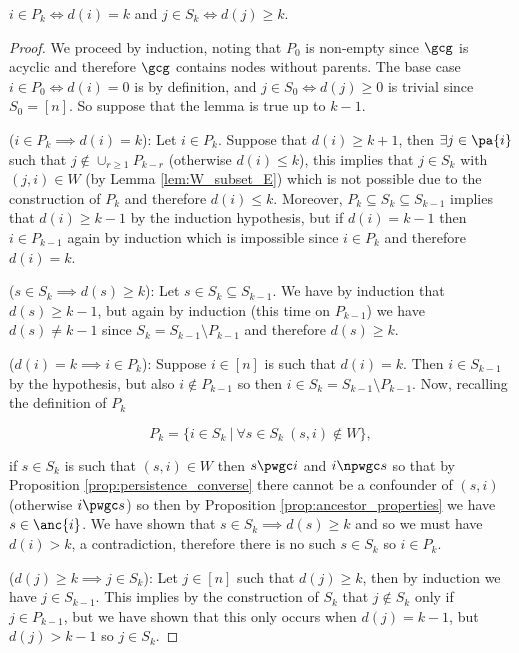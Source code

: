 \begin{lemma}
  \label{lem:depth_lemma}
  $i \in P_k \iff d(i) = k$ and $j \in S_k \iff d(j) \ge k$.
\end{lemma}
\begin{proof}
  We proceed by induction, noting that $P_0$ is non-empty since $\gcg$
  is acyclic and therefore $\gcg$ contains nodes without parents.  The
  base case $i \in P_0 \iff d(i) = 0$ is by definition, and
  $j \in S_0 \iff d(j) \ge 0$ is trivial since $S_0 = [n]$.  So
  suppose that the lemma is true up to $k - 1$.

  ($i \in P_k \implies d(i) = k$): Let $i \in P_k$.  Suppose that
  $d(i) \ge k + 1$, then $\exists j \in \pa{i}$ such that
  $j \not\in \cup_{r \ge 1}P_{k - r}$ (otherwise $d(i) \le k$), this
  implies that $j \in S_k$ with $(j, i) \in W$ (by Lemma
  \ref{lem:W_subset_E}) which is not possible due to the construction of
  $P_k$ and therefore $d(i) \le k$.  Moreover,
  $P_k \subseteq S_k \subseteq S_{k - 1}$ implies that
  $d(i) \ge k - 1$ by the induction hypothesis, but if $d(i) = k - 1$
  then $i \in P_{k - 1}$ again by induction which is impossible since
  $i \in P_k$ and therefore $d(i) = k$.

  ($s \in S_k \implies d(s) \ge k$): Let
  $s \in S_k \subseteq S_{k - 1}$.  We have by induction that
  $d(s) \ge k - 1$, but again by induction (this time on $P_{k - 1}$)
  we have $d(s) \ne k - 1$ since $S_k = S_{k - 1} \setminus P_{k - 1}$
  and therefore $d(s) \ge k$.

  ($d(i) = k \implies i \in P_k$): Suppose $i \in [n]$ is such that
  $d(i) = k$.  Then $i \in S_{k - 1}$ by the hypothesis, but also
  $i \not\in P_{k - 1}$ so then
  $i \in S_k = S_{k - 1} \setminus P_{k - 1}$.  Now, recalling the
  definition of $P_k$

  \begin{equation*}
    P_k = \{i \in S_k\ |\ \forall s \in S_k\ (s, i) \not\in W \},
  \end{equation*}

  if $s \in S_k$ is such that $(s, i) \in W$ then $s \pwgc i$ and
  $i \npwgc s$ so that by Proposition \ref{prop:persistence_converse}
  there cannot be a confounder of $(s, i)$ (otherwise $i \pwgc s$) so
  then by Proposition \ref{prop:ancestor_properties} we have
  $s \in \anc{i}$.  We have shown that $s \in S_k \implies d(s) \ge k$
  and so we must have $d(i) > k$, a contradiction, therefore there is
  no such $s \in S_k$ so $i \in P_k$.

  ($d(j) \ge k \implies j \in S_k$): Let $j \in [n]$ such that
  $d(j) \ge k$, then by induction we have $j \in S_{k - 1}$.  This
  implies by the construction of $S_k$ that $j \not\in S_k$ only if
  $j \in P_{k - 1}$, but we have shown that this only occurs when
  $d(j) = k - 1$, but $d(j) > k - 1$ so $j \in S_k$.
\end{proof}

